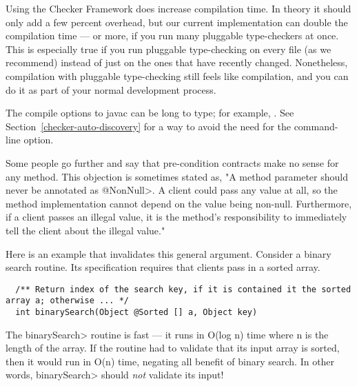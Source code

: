 Using the Checker Framework does increase compilation time.  In theory it
should only add a few percent overhead, but our current implementation
can double the compilation time --- or more, if you run many pluggable
type-checkers at once.  This is especially true if you run pluggable
type-checking on every file (as we recommend) instead of just on the ones
that have recently changed.
Nonetheless, compilation with pluggable type-checking still feels like
compilation, and you can do it as part of your normal development process.



\begin{sloppypar}
The compile options to javac can be long to type; for example,
.
See Section~\ref{checker-auto-discovery} for a way to avoid the need for
the  command-line option.
\end{sloppypar}



Some people go further and say that pre-condition contracts make no sense
for any method.  This objection is sometimes stated as, "A method parameter
should never be annotated as \<@NonNull>.  A client could pass any value at
all, so the method implementation cannot depend on the value being
non-null.  Furthermore, if a client passes an illegal value, it is the
method's responsibility to immediately tell the client about the illegal
value."

Here is an example that invalidates this general argument.  Consider a
binary search routine.  Its specification requires that clients pass in a
sorted array.

\begin{smaller}
\begin{Verbatim}
  /** Return index of the search key, if it is contained it the sorted array a; otherwise ... */
  int binarySearch(Object @Sorted [] a, Object key)
\end{Verbatim}
\end{smaller}

The \<binarySearch> routine is fast --- it runs in O(log n) time where n is
the length of the array.  If the routine had to validate that its input
array is sorted, then it would run in O(n) time, negating all benefit of
binary search.  In other words, \<binarySearch> should \emph{not} validate
its input!

